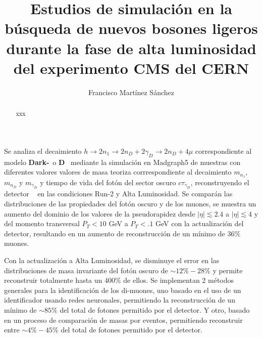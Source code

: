 \documentclass[12pt]{report}
\begin{document}
\title{Estudios de simulación en la búsqueda de nuevos bosones ligeros durante la fase de alta luminosidad del experimento CMS del CERN}
\author{Francisco Martínez Sánchez}
\maketitle
%

\begin{resumen}\thispagestyle{empty}
Se analiza el decaimiento $h \rightarrow 2n_1 \rightarrow 2n_D + 2\gamma_D \rightarrow 2n_D + 4\mu$ correspondiente al modelo \textbf{Dark-}\SUSY ~o \MSSM\textbf{D}~ mediante la simulación en \textsf{Madgraph5} de muestras con diferentes valores valores de masa teoriza corrrespondiente al decaimiento $m_{n_1}$, $m_{n_D}$ y $m_{\gamma_D}$ y tiempo de vida del fotón del sector oscuro $c\tau_{\gamma_D}$, reconstruyendo el detector \CMS~ en las condiciones Run-2 y Alta Luminosidad. Se comparán las distribuciones de las propiedades del fotón oscuro y de los muones, se muestra un aumento del dominio de los valores de la pseudorapidez desde $|\eta|\lesssim 2.4$ a $|\eta|\lesssim 4$ y del momento transversal $P_T<10$ GeV a $P_T<.1$ GeV con la actualización del detector, resultando en un aumento de reconstrucción de un mínimo de $36\%$ muones. 

Con la actualización a Alta Luminosidad, se disminuye el error en las distribuciones de masa invariante del fotón oscuro de $\sim 12\% - 28\%$ y permite reconstruir totalmente hasta un $400\%$ de ellos. Se implementan 2 métodos generales para la identificación de los di-muones, uno basado en el uso de un identificador usando redes neuronales, permitiendo la reconstrucción de un mínimo de $\sim 85\%$ del total de fotones permitido por el detector. Y otro, basado en un proceso de comparación de masas por eventos, permitiendo reconstruir entre $\sim 4\%-45\%$ del total de fotones permitido por el detector. 
\end{resumen}
\begin{abstract}\thispagestyle{empty}%
xxx
\end{abstract}
\end{document}
